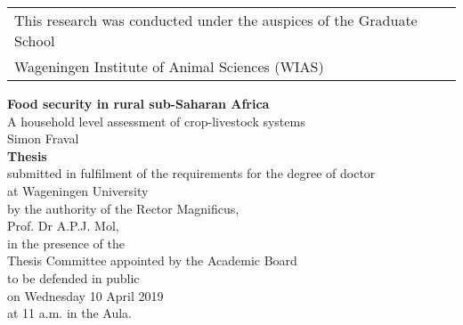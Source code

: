 \begin{tabular}{l}
    \small{This research was conducted under the auspices of the Graduate School}             \\
    \small{Wageningen Institute of Animal Sciences (WIAS)}                                    \\
\end{tabular}

\newpage
\thispagestyle{empty}
\begin{center}
\Huge{\textbf{Food security in rural sub-Saharan Africa}} \\
\large{A household level assessment of crop-livestock systems} \\
\vspace*{1cm}
\Large{Simon Fraval}\\
\normalsize
\vspace*{\fill}
\textbf{Thesis} \\
submitted in fulfilment of the requirements for the degree of doctor\\
at Wageningen University\\
by the authority of the Rector Magnificus,\\
Prof. Dr A.P.J. Mol,\\
in the presence of the\\
Thesis Committee appointed by the Academic Board\\
to be defended in public\\
on Wednesday 10 April 2019\\
at 11 a.m. in the Aula.\\
\end{center}

